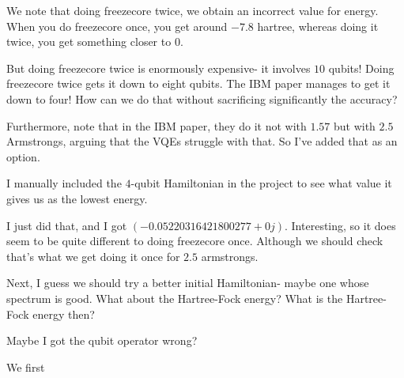 \documentclass[]{article}
\title{}
\author{Sean Thrasher}
\theoremstyle{definition}
\begin{document}
\maketitle

\begin{abstract}

\end{abstract}

We note that doing freezecore twice, we obtain an incorrect value for energy. When you do freezecore once, you get around $ -7.8 $ hartree, whereas doing it twice, you get something closer to $ 0 $. 

But doing freezecore twice is enormously expensive- it involves $ 10 $ qubits! Doing freezecore twice gets it down to eight qubits. The IBM paper manages to get it down to four! How can we do that without sacrificing significantly the accuracy? 

Furthermore, note that in the IBM paper, they do it not with $ 1.57 $ but with $ 2.5 $ Armstrongs, arguing that the VQEs struggle with that. So I've added that as an option. 

I manually included the $ 4 $-qubit Hamiltonian in the project to see what value it gives us as the lowest energy. 

I just did that, and I got $ (-0.05220316421800277+0j) $. Interesting, so it does seem to be quite different to doing freezecore once. Although we should check that's what we get doing it once for $ 2.5 $ armstrongs. 

Next, I guess we should try a better initial Hamiltonian- maybe one whose spectrum is good. What about the Hartree-Fock energy? 
What is the Hartree-Fock energy then? 

Maybe I got the qubit operator wrong? 


We first 

\printbibliography
\end{document}
